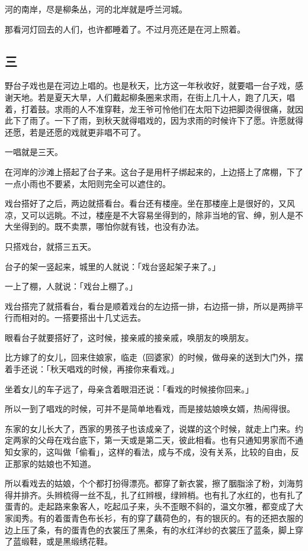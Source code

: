 \documentclass[UTF8]{ctexart}
\begin{document}
河的南岸，尽是柳条丛，河的北岸就是呼兰河城。

那看河灯回去的人们，也许都睡着了。不过月亮还是在河上照着。

\subsection{三}

野台子戏也是在河边上唱的。也是秋天，比方这一年秋收好，就要唱一台子戏，感谢天地。若是夏天大旱，人们戴起柳条圈来求雨，在街上几十人，跑了几天，唱着，打着鼓。求雨的人不准穿鞋，龙王爷可怜他们在太阳下边把脚烫得很痛，就因此下了雨了。一下了雨，到秋天就得唱戏的，因为求雨的时候许下了愿。许愿就得还愿，若是还愿的戏就更非唱不可了。

一唱就是三天。

在河岸的沙滩上搭起了台子来。这台子是用杆子绑起来的，上边搭上了席棚，下了一点小雨也不要紧，太阳则完全可以遮住的。

戏台搭好了之后，两边就搭看台。看台还有楼座。坐在那楼座上是很好的，又风凉，又可以远眺。不过，楼座是不大容易坐得到的，除非当地的官、绅，别人是不大坐得到的。既不卖票，哪怕你就有钱，也没有办法。

只搭戏台，就搭三五天。

台子的架一竖起来，城里的人就说：「戏台竖起架子来了。」

一上了棚，人就说：「戏台上棚了。」

戏台搭完了就搭看台，看台是顺着戏台的左边搭一排，右边搭一排，所以是两排平行而相对的。一搭要搭出十几丈远去。

眼看台子就要搭好了，这时候，接亲戚的接亲戚，唤朋友的唤朋友。

比方嫁了的女儿，回来住娘家，临走（回婆家）的时候，做母亲的送到大门外，摆着手还说：「秋天唱戏的时候，再接你来看戏。」

坐着女儿的车子远了，母亲含着眼泪还说：「看戏的时候接你回来。」

所以一到了唱戏的时候，可并不是简单地看戏，而是接姑娘唤女婿，热闹得很。

东家的女儿长大了，西家的男孩子也该成亲了，说媒的这个时候，就走上门来。约定两家的父母在戏台底下，第一天或是第二天，彼此相看。也有只通知男家而不通知女家的，这叫做「偷看」，这样的看法，成与不成，没有关系，比较的自由，反正那家的姑娘也不知道。

所以看戏去的姑娘，个个都打扮得漂亮。都穿了新衣裳，擦了胭脂涂了粉，刘海剪得并排齐。头辫梳得一丝不乱，扎了红辫根，绿辫梢。也有扎了水红的，也有扎了蛋青的。走起路来象客人，吃起瓜子来，头不歪眼不斜的，温文尔雅，都变成了大家闺秀。有的着蛋青色布长衫，有的穿了藕荷色的，有的银灰的。有的还把衣服的边上压了条，有的蛋青色的衣裳压了黑条，有的水红洋纱的衣裳压了蓝条，脚上穿了蓝缎鞋，或是黑缎绣花鞋。
\end{document}
